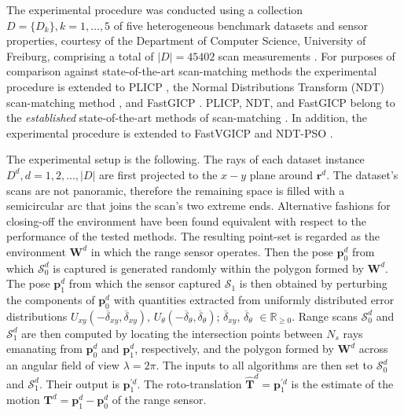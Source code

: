 The experimental procedure was conducted using a collection $D = \{D_k\}, k =
1,\dots,5$ of five heterogeneous benchmark datasets and sensor properties,
courtesy of the Department of Computer Science, University of Freiburg,
comprising a total of $|D| = 45402$ scan measurements \cite{datasets_link}.
For purposes of comparison against state-of-the-art scan-matching methods the
experimental procedure is extended to PLICP \cite{Censi2008b}, the Normal
Distributions Transform (NDT) scan-matching method \cite{Biber}, and FastGICP
\cite{Segal2009}. PLICP, NDT, and FastGICP belong to the \textit{established}
state-of-the-art methods of scan-matching
\cite{Koide2021,Xu2018a,Sobreira2019a,Pishehvari2019a,Qingshan2019a,Pham2021a}.
In addition, the experimental procedure is extended to FastVGICP
\cite{Pham2021a} and NDT-PSO \cite{Bouraine2020}.

The experimental setup is the following. The rays of each dataset instance
$D^d, d = 1,2,\dots,|D|$ are first projected to the $x-y$ plane around
$\bm{r}^d$.  The dataset's scans are not panoramic, therefore the remaining
space is filled with a semicircular arc that joins the scan's two extreme ends.
Alternative fashions for closing-off the environment have been found equivalent
with respect to the performance of the tested methods. The resulting point-set
is regarded as the environment $\bm{W}^d$ in which the range sensor operates.
Then the pose $\bm{p}_0^d$ from which $\mathcal{S}_0^d$ is captured is
generated randomly within the polygon formed by $\bm{W}^d$. The pose
$\bm{p}_1^d$ from which the sensor captured $\mathcal{S}_1$ is then obtained by
perturbing the components of $\bm{p}_0^d$ with quantities extracted from
uniformly distributed error distributions $U_{xy}(-\overline{\delta}_{xy},
\overline{\delta}_{xy})$, $U_{\theta}(-\overline{\delta}_{\theta},
\overline{\delta}_{\theta})$; $\overline{\delta}_{xy}$,
$\overline{\delta}_\theta$ $\in \mathbb{R}_{\geq 0}$.  Range scans
$\mathcal{S}_0^d$ and $\mathcal{S}_1^d$ are then computed by locating the
intersection points between $N_s$ rays emanating from $\bm{p}_0^d$ and
$\bm{p}_1^d$, respectively, and the polygon formed by $\bm{W}^d$ across an
angular field of view $\lambda = 2\pi$. The inputs to all algorithms are then
set to $\mathcal{S}_0^d$ and $\mathcal{S}_1^d$. Their output is
$\bm{p}_1^{\prime d}$. The roto-translation $\hat{\bm{T}}^d = \bm{p}_1^{\prime
d}$ is the estimate of the motion $\bm{T}^d = \bm{p}_1^d - \bm{p}_0^d$ of the
range sensor.

